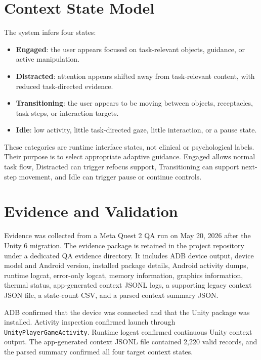 \documentclass[conference]{IEEEtran}
\begin{document}
\section{Context State Model}
The system infers four states:
\begin{itemize}
\item \textbf{Engaged}: the user appears focused on task-relevant objects, guidance, or active manipulation.
\item \textbf{Distracted}: attention appears shifted away from task-relevant content, with reduced task-directed evidence.
\item \textbf{Transitioning}: the user appears to be moving between objects, receptacles, task steps, or interaction targets.
\item \textbf{Idle}: low activity, little task-directed gaze, little interaction, or a pause state.
\end{itemize}

These categories are runtime interface states, not clinical or psychological labels. Their purpose is to select appropriate adaptive guidance. Engaged allows normal task flow, Distracted can trigger refocus support, Transitioning can support next-step movement, and Idle can trigger pause or continue controls.

\section{Evidence and Validation}
Evidence was collected from a Meta Quest 2 QA run on May 20, 2026 after the Unity 6 migration. The evidence package is retained in the project repository under a dedicated QA evidence directory. It includes ADB device output, device model and Android version, installed package details, Android activity dumps, runtime logcat, error-only logcat, memory information, graphics information, thermal status, app-generated context JSONL logs, a supporting legacy context JSON file, a state-count CSV, and a parsed context summary JSON.

ADB confirmed that the device was connected and that the Unity package was installed. Activity inspection confirmed launch through \texttt{UnityPlayerGameActivity}. Runtime logcat confirmed continuous Unity context output. The app-generated context JSONL file contained 2,220 valid records, and the parsed summary confirmed all four target context states.
\end{document}
